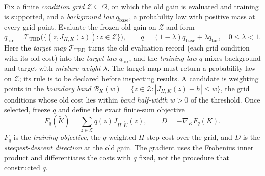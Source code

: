 \begin{definition}
\label{def:stage2_training_law}
Fix a finite \emph{condition grid} $\mathcal Z\subseteq\Omega$, on which
the old gain is evaluated and training is supported, and a \emph{background
law} $q_{\mathrm{base}}$, a probability law with positive mass at every grid
point. Evaluate the frozen old gain on $\mathcal Z$ and form
\begin{equation}
\label{eq:stage2_target_law}
 q_{\mathrm{tar}}=\mathcal T_{\mathrm{TBD}}
       \big(\{(z,J_{H,K}(z)):z\in\mathcal Z\}\big),
 \qquad q=(1-\lambda)q_{\mathrm{base}}+\lambda q_{\mathrm{tar}},
 \quad 0\le\lambda<1.
\end{equation}
Here the \emph{target map} $\mathcal T_{\mathrm{TBD}}$ turns the old
evaluation record (each grid condition with its old cost) into the
\emph{target law} $q_{\mathrm{tar}}$, and the \emph{training law} $q$
mixes background and target with \emph{mixture weight} $\lambda$.
The target map must return a probability law on $\mathcal Z$; its rule is
to be declared before inspecting results. A candidate is weighting points
in the \emph{boundary band}
$\mathcal B_K(w)=\{z\in\mathcal Z:|J_{H,K}(z)-h|\le w\}$, the grid
conditions whose old cost lies within \emph{band half-width} $w>0$ of the
threshold.
Once selected, freeze $q$ and define the exact finite-sum objective
\begin{equation}
\label{eq:stage2_training_objective}
 F_q(\widetilde K)=\sum_{z\in\mathcal Z}q(z)J_{H,\widetilde K}(z),
 \qquad D=-\nabla_K F_q(K).
\end{equation}
$F_q$ is the \emph{training objective}, the $q$-weighted $H$-step cost over
the grid, and $D$ is the \emph{steepest-descent direction} at the old gain.
The gradient uses the Frobenius inner product and differentiates the
costs with $q$ fixed, not the procedure that constructed $q$.
\end{definition}


